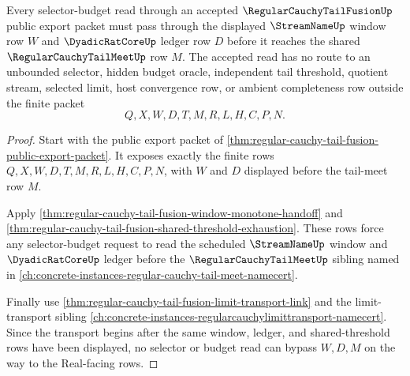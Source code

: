 \begin{theorem}
\label{thm:regular-cauchy-tail-fusion-selector-budget-window-lock}
Every selector-budget read through an accepted $\RegularCauchyTailFusionUp$ public export packet must pass through the displayed $\StreamNameUp$ window row $W$ and $\DyadicRatCoreUp$ ledger row $D$ before it reaches the shared $\RegularCauchyTailMeetUp$ row $M$. The accepted read has no route to an unbounded selector, hidden budget oracle, independent tail threshold, quotient stream, selected limit, host convergence row, or ambient completeness row outside the finite packet
$$
Q,X,W,D,T,M,R,L,H,C,P,N.
$$
\end{theorem}
\begin{proof}
Start with the public export packet of \autoref{thm:regular-cauchy-tail-fusion-public-export-packet}. It exposes exactly the finite rows $Q,X,W,D,T,M,R,L,H,C,P,N$, with $W$ and $D$ displayed before the tail-meet row $M$.

Apply \autoref{thm:regular-cauchy-tail-fusion-window-monotone-handoff} and \autoref{thm:regular-cauchy-tail-fusion-shared-threshold-exhaustion}. These rows force any selector-budget request to read the scheduled $\StreamNameUp$ window and $\DyadicRatCoreUp$ ledger before the $\RegularCauchyTailMeetUp$ sibling named in \autoref{ch:concrete-instances-regular-cauchy-tail-meet-namecert}.

Finally use \autoref{thm:regular-cauchy-tail-fusion-limit-transport-link} and the limit-transport sibling \autoref{ch:concrete-instances-regularcauchylimittransport-namecert}. Since the transport begins after the same window, ledger, and shared-threshold rows have been displayed, no selector or budget read can bypass $W,D,M$ on the way to the Real-facing rows.
\end{proof}

